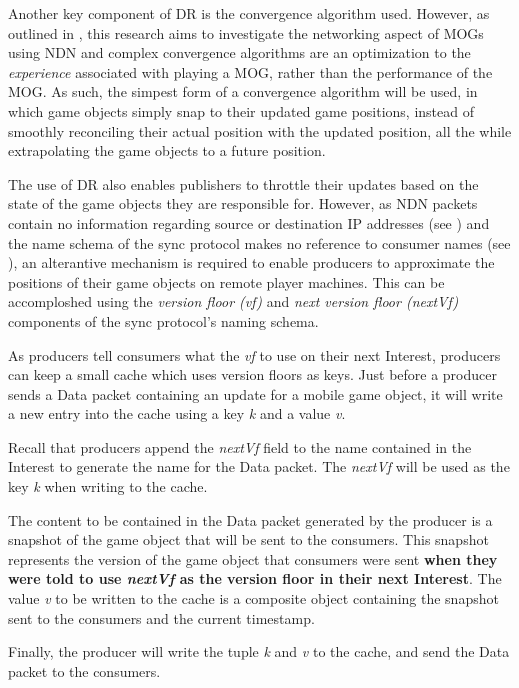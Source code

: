Another key component of DR is the convergence algorithm used. However, as outlined in , this research aims to investigate the networking aspect of MOGs using NDN and complex convergence algorithms are an optimization to the \textit{experience} associated with playing a MOG, rather than the performance of the MOG. As such, the simpest form of a convergence algorithm will be used, in which game objects simply snap to their updated game positions, instead of smoothly reconciling their actual position with the updated position, all the while extrapolating the game objects to a future position.

The use of DR also enables publishers to throttle their updates based on the state of the game objects they are responsible for. However, as NDN packets contain no information regarding source or destination IP addresses (see ) and the name schema of the sync protocol makes no reference to consumer names (see ), an alterantive mechanism is required to enable producers to approximate the positions of their game objects on remote player machines. This can be accomploshed using the \textit{version floor (vf)} and \textit{next version floor (nextVf)} components of the sync protocol's naming schema.

As producers tell consumers what the \textit{vf} to use on their next Interest, producers can keep a small cache which uses version floors as keys. Just before a producer sends a Data packet containing an update for a mobile game object, it will write a new entry into the cache using a key \textit{k} and a value \textit{v}. 

Recall that producers append the \textit{nextVf} field to the name contained in the Interest to generate the name for the Data packet. The \textit{nextVf} will be used as the key \textit{k} when writing to the cache.

The content to be contained in the Data packet generated by the producer is a snapshot of the game object that will be sent to the consumers. This snapshot represents the version of the game object that consumers were sent \textbf{when they were told to use \textit{nextVf} as the version floor in their next Interest}. The value \textit{v} to be written to the cache is a composite object containing the snapshot sent to the consumers and the current timestamp. 

Finally, the producer will write the tuple \textit{k} and \textit{v} to the cache, and send the Data packet to the consumers. 

